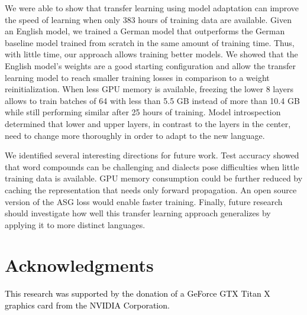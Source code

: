 \documentclass[11pt,a4paper]{article}
\newcommand{\anonymize}[2]{\textcolor{black}{#1}}		%
\begin{document}
We were able to show that transfer learning using model adaptation can improve the speed of learning when only 383 hours of training data are available.
Given an English model, we trained a German model that outperforms the German baseline model trained from scratch in the same amount of training time.
Thus, with little time, our approach allows training better models.
We showed that the English model's weights are a good starting configuration and allow the transfer learning model to reach smaller training losses in comparison to a weight reinitialization.
When less GPU memory is available, freezing the lower 8 layers allows to train batches of 64 with less than 5.5 GB instead of more than 10.4 GB while still performing similar after 25 hours of training.
Model introspection determined that lower and upper layers, in contrast to the layers in the center, need to change more thoroughly in order to adapt to the new language.

We identified several interesting directions for future work.
Test accuracy showed that word compounds can be challenging and dialects pose difficulties when little training data is available.
GPU memory consumption could be further reduced by caching the representation that needs only forward propagation.
An open source version of the \ac{ASG} loss would enable faster training.
Finally, future research should investigate how well this transfer learning approach generalizes by applying it to more distinct languages.


\section*{Acknowledgments}
\anonymize{
This research was supported by the donation of a GeForce GTX Titan X graphics card from the NVIDIA Corporation.
}{
Omitted for double-blind review.
}


%
%



%
\end{document}

